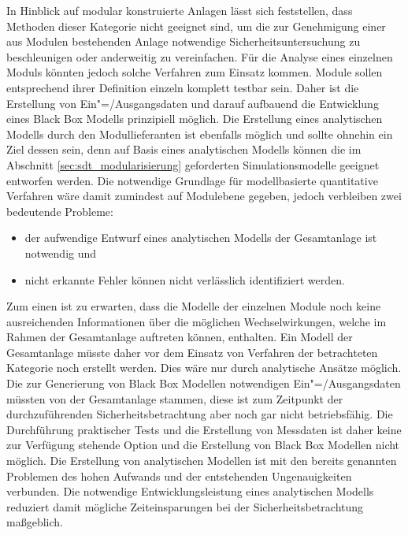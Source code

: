 In Hinblick auf modular konstruierte Anlagen l\"asst sich feststellen, dass Methoden dieser Kategorie nicht geeignet sind, um die zur Genehmigung einer aus Modulen bestehenden Anlage notwendige Sicherheitsuntersuchung zu beschleunigen oder anderweitig zu vereinfachen. \newline
F\"ur die Analyse eines einzelnen Moduls k\"onnten jedoch solche Verfahren zum Einsatz kommen. Module sollen entsprechend ihrer Definition einzeln komplett testbar sein. Daher ist die Erstellung von Ein"=/Ausgangsdaten und darauf aufbauend die Entwicklung eines Black Box Modells prinzipiell m\"oglich. Die Erstellung eines analytischen Modells durch den Modullieferanten ist ebenfalls m\"oglich und sollte ohnehin ein Ziel dessen sein, denn auf Basis eines analytischen Modells k\"onnen die im Abschnitt \ref{sec:sdt_modularisierung} geforderten Simulationsmodelle geeignet entworfen werden. Die notwendige Grundlage f\"ur modellbasierte quantitative Verfahren w\"are damit zumindest auf Modulebene gegeben, jedoch verbleiben zwei bedeutende Probleme: \begin{itemize}
\item der aufwendige Entwurf eines analytischen Modells der Gesamtanlage ist notwendig und
\item nicht erkannte Fehler k\"onnen nicht verl\"asslich identifiziert werden.
\end{itemize}
Zum einen ist zu erwarten, dass die Modelle der einzelnen Module noch keine ausreichenden Informationen \"uber die m\"oglichen Wechselwirkungen, welche im Rahmen der Gesamtanlage auftreten k\"onnen, enthalten. Ein Modell der Gesamtanlage m\"usste daher vor dem Einsatz von Verfahren der betrachteten Kategorie noch erstellt werden. Dies w\"are nur durch analytische Ans\"atze m\"oglich. Die zur Generierung von Black Box Modellen notwendigen Ein"=/Ausgangsdaten m\"ussten von der Gesamtanlage stammen, diese ist zum Zeitpunkt der durchzuf\"uhrenden Sicherheitsbetrachtung aber noch gar nicht betriebsf\"ahig. Die Durchf\"uhrung praktischer Tests und die Erstellung von Messdaten ist daher keine zur Verf\"ugung stehende Option und die Erstellung von Black Box Modellen nicht m\"oglich. Die Erstellung von analytischen Modellen ist mit den bereits genannten Problemen des hohen Aufwands und der entstehenden Ungenauigkeiten verbunden. Die notwendige Entwicklungsleistung eines analytischen Modells reduziert damit m\"ogliche Zeiteinsparungen bei der Sicherheitsbetrachtung ma\ss{}geblich. \newline
